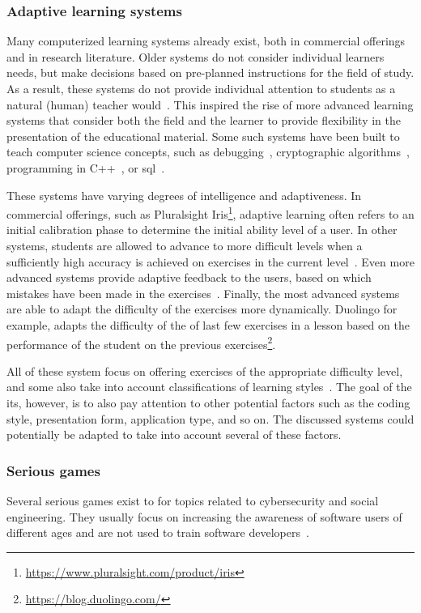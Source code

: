 \subsubsection{Adaptive learning systems}
Many computerized learning systems already exist, both in commercial offerings and in research literature.
Older systems do not consider individual learners needs, but make decisions based on pre-planned instructions for the field of study.
As a result, these systems do not provide individual attention to students as a natural (human) teacher would~\cite{mahdi2016intelligent}.
This inspired the rise of more advanced learning systems that consider both the field and the learner to provide flexibility in the presentation of the educational material.
Some such systems have been built to teach computer science concepts, such as debugging~\cite{carter2013tutoring}, cryptographic algorithms~\cite{abuel2018intelligent,mahdi2016intelligent}, programming in C++~\cite{abu2009evaluating}, or \gls{sql}~\cite{mitrovic2003intelligent}.

These systems have varying degrees of intelligence and adaptiveness.
In commercial offerings, such as Pluralsight Iris\footnote{\url{https://www.pluralsight.com/product/iris}}, adaptive learning often refers to an initial calibration phase to determine the initial ability level of a user.
In other systems, students are allowed to advance to more difficult levels when a sufficiently high accuracy is achieved on exercises in the current level~\cite{abu2009evaluating,mahdi2016intelligent}.
Even more advanced systems provide adaptive feedback to the users, based on which mistakes have been made in the exercises~\cite{carter2013tutoring,abuel2018intelligent}.
Finally, the most advanced systems are able to adapt the difficulty of the exercises more dynamically.
Duolingo for example, adapts the difficulty of the of last few exercises in a lesson based on the performance of the student on the previous exercises\footnote{\url{https://blog.duolingo.com/}}.

All of these system focus on offering exercises of the appropriate difficulty level, and some also take into account classifications of learning styles~\cite{alshammari2015design,felder1988learning}.
The goal of the \gls{its}, however, is to also pay attention to other potential factors such as the coding style, presentation form, application type, and so on.
The discussed systems could potentially be adapted to take into account several of these factors.

\subsubsection{Serious games}
Several serious games exist to for topics related to cybersecurity and social engineering.
They usually focus on increasing the awareness of software users of different ages and are not used to train software developers~\cite{giannakas2015cyberaware,jin2018evaluation,beckers2016serious,yasin2018design}.

